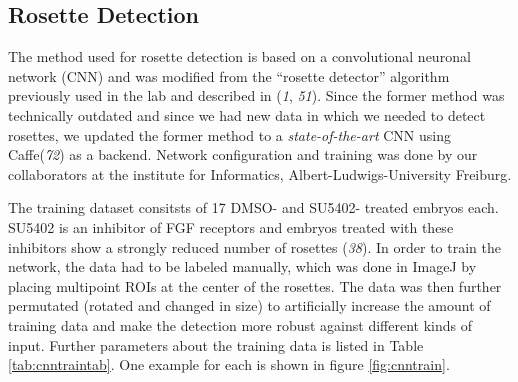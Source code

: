\documentclass[10pt, b5paper, singlespacinge, twoside]{reedthesis} %
\theoremstyle{definition}
\theoremstyle{definition}
\theoremstyle{definition}
\theoremstyle{remark}
\begin{document}
\hypertarget{CNN}{%
\subsection{Rosette Detection}\label{CNN}}

The method used for rosette detection is based on a convolutional neuronal network (CNN) and was modified from the ``rosette detector'' algorithm previously used in the lab and described in (\emph{1}, \emph{51}). Since the former method was technically outdated and since we had new data in which we needed to detect rosettes, we updated the former method to a \emph{state-of-the-art} CNN using Caffe(\emph{72}) as a backend. Network configuration and training was done by our collaborators at the institute for Informatics, Albert-Ludwigs-University Freiburg.

The training dataset consitsts of 17 DMSO- and SU5402- treated embryos each. SU5402 is an inhibitor of FGF receptors and embryos treated with these inhibitors show a strongly reduced number of rosettes (\emph{38}). In order to train the network, the data had to be labeled manually, which was done in ImageJ by placing multipoint ROIs at the center of the rosettes. The data was then further permutated (rotated and changed in size) to artificially increase the amount of training data and make the detection more robust against different kinds of input. Further parameters about the training data is listed in Table \ref{tab:cnntraintab}. One example for each is shown in figure \ref{fig:cnntrain}.
\end{document}
